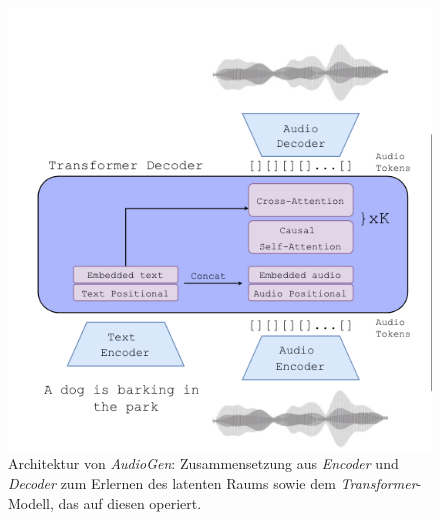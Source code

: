 \documentclass[
  a4paper,  %
  twoside,  %
  bibliography=totoc,
  headsepline,
  cleardoublepage=empty,
  parskip=half,
  draft=false
]{scrbook}
\begin{document}
\begin{figure}[h]
  \centering
  \includegraphics[width=.5\textwidth]{graphics/Audiogen.png}
  \caption[AudioGen Architektur]{Architektur von \emph{AudioGen}: Zusammensetzung aus \emph{Encoder} und \emph{Decoder} zum Erlernen des latenten Raums sowie dem \emph{Transformer}-Modell, das auf diesen operiert. \cite{kreuk_audiogen_2023}}
  \label{fig:audiogen}
\end{figure}
\end{document}
